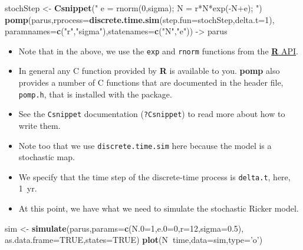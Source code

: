 \documentclass[]{article}
\newenvironment{Shaded}{\begin{snugshade}}{\end{snugshade}}
\newcommand{\KeywordTok}[1]{\textcolor[rgb]{0.13,0.29,0.53}{\textbf{#1}}}
\newcommand{\DataTypeTok}[1]{\textcolor[rgb]{0.13,0.29,0.53}{#1}}
\newcommand{\DecValTok}[1]{\textcolor[rgb]{0.00,0.00,0.81}{#1}}
\newcommand{\FloatTok}[1]{\textcolor[rgb]{0.00,0.00,0.81}{#1}}
\newcommand{\StringTok}[1]{\textcolor[rgb]{0.31,0.60,0.02}{#1}}
\newcommand{\OtherTok}[1]{\textcolor[rgb]{0.56,0.35,0.01}{#1}}
\newcommand{\OperatorTok}[1]{\textcolor[rgb]{0.81,0.36,0.00}{\textbf{#1}}}
\newcommand{\NormalTok}[1]{#1}
\begin{document}
\begin{Shaded}
\begin{Highlighting}[]
\NormalTok{stochStep <-}\StringTok{ }\KeywordTok{Csnippet}\NormalTok{(}\StringTok{"}
\StringTok{  e = rnorm(0,sigma);}
\StringTok{  N = r*N*exp(-N+e);}
\StringTok{"}\NormalTok{)}
\KeywordTok{pomp}\NormalTok{(parus,}\DataTypeTok{rprocess=}\KeywordTok{discrete.time.sim}\NormalTok{(}\DataTypeTok{step.fun=}\NormalTok{stochStep,}\DataTypeTok{delta.t=}\DecValTok{1}\NormalTok{),}
     \DataTypeTok{paramnames=}\KeywordTok{c}\NormalTok{(}\StringTok{"r"}\NormalTok{,}\StringTok{"sigma"}\NormalTok{),}\DataTypeTok{statenames=}\KeywordTok{c}\NormalTok{(}\StringTok{"N"}\NormalTok{,}\StringTok{"e"}\NormalTok{)) ->}\StringTok{ }\NormalTok{parus}
\end{Highlighting}
\end{Shaded}

\begin{itemize}
\item
  Note that in the above, we use the \texttt{exp} and \texttt{rnorm}
  functions from the
  \href{https://cran.r-project.org/doc/manuals/r-release/R-exts.html\#The-R-API}{\textbf{R}
  API}.
\item
  In general any C function provided by \textbf{R} is available to you.
  \textbf{pomp} also provides a number of C functions that are
  documented in the header file, \texttt{pomp.h}, that is installed with
  the package.
\item
  See the \texttt{Csnippet} documentation (\texttt{?Csnippet}) to read
  more about how to write them.
\item
  Note too that we use \texttt{discrete.time.sim} here because the model
  is a stochastic map.
\item
  We specify that the time step of the discrete-time process is
  \texttt{delta.t}, here, 1~yr.
\item
  At this point, we have what we need to simulate the stochastic Ricker
  model.
\end{itemize}

\begin{Shaded}
\begin{Highlighting}[]
\NormalTok{sim <-}\StringTok{ }\KeywordTok{simulate}\NormalTok{(parus,}\DataTypeTok{params=}\KeywordTok{c}\NormalTok{(}\DataTypeTok{N.0=}\DecValTok{1}\NormalTok{,}\DataTypeTok{e.0=}\DecValTok{0}\NormalTok{,}\DataTypeTok{r=}\DecValTok{12}\NormalTok{,}\DataTypeTok{sigma=}\FloatTok{0.5}\NormalTok{),}
                \DataTypeTok{as.data.frame=}\OtherTok{TRUE}\NormalTok{,}\DataTypeTok{states=}\OtherTok{TRUE}\NormalTok{)}
\KeywordTok{plot}\NormalTok{(N}\OperatorTok{~}\NormalTok{time,}\DataTypeTok{data=}\NormalTok{sim,}\DataTypeTok{type=}\StringTok{'o'}\NormalTok{)}
\end{Highlighting}
\end{Shaded}
\end{document}
